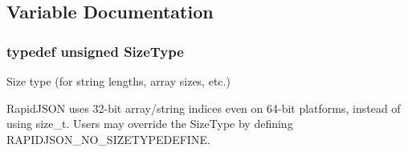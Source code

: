 \subsection{Variable Documentation}
\subsubsection[{\texorpdfstring{Size\+Type}{SizeType}}]{ typedef unsigned Size\+Type}\hypertarget{a00677_a5ed6e6e67250fadbd041127e6386dcb5}{}\label{a00677_a5ed6e6e67250fadbd041127e6386dcb5}


Size type (for string lengths, array sizes, etc.) 

Rapid\+J\+S\+ON uses 32-\/bit array/string indices even on 64-\/bit platforms, instead of using {\ttfamily size\+\_\+t}. Users may override the Size\+Type by defining R\+A\+P\+I\+D\+J\+S\+O\+N\+\_\+\+N\+O\+\_\+\+S\+I\+Z\+E\+T\+Y\+P\+E\+D\+E\+F\+I\+NE. 
